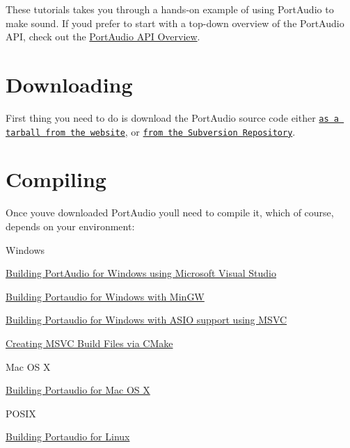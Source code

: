 These tutorials takes you through a hands-\/on example of using Port\+Audio to make sound. If you\textquotesingle{}d prefer to start with a top-\/down overview of the Port\+Audio A\+PI, check out the \hyperlink{api_overview}{Port\+Audio A\+PI Overview}.\hypertarget{tutorial_start_tut_start1}{}\section{Downloading}\label{tutorial_start_tut_start1}
First thing you need to do is download the Port\+Audio source code either \href{http://www.portaudio.com/download.html}{\tt as a tarball from the website}, or \href{http://www.portaudio.com/usingsvn.html}{\tt from the Subversion Repository}.\hypertarget{tutorial_start_tut_start2}{}\section{Compiling}\label{tutorial_start_tut_start2}
Once you\textquotesingle{}ve downloaded Port\+Audio you\textquotesingle{}ll need to compile it, which of course, depends on your environment\+:


\begin{DoxyItemize}
\item Windows
\begin{DoxyItemize}
\item \hyperlink{compile_windows}{Building Port\+Audio for Windows using Microsoft Visual Studio}
\item \hyperlink{compile_windows_mingw}{Building Portaudio for Windows with Min\+GW}
\item \hyperlink{compile_windows_asio_msvc}{Building Portaudio for Windows with A\+S\+IO support using M\+S\+VC}
\item \hyperlink{compile_cmake}{Creating M\+S\+VC Build Files via C\+Make}
\end{DoxyItemize}
\item Mac OS X
\begin{DoxyItemize}
\item \hyperlink{compile_mac_coreaudio}{Building Portaudio for Mac OS X}
\end{DoxyItemize}
\item P\+O\+S\+IX
\begin{DoxyItemize}
\item \hyperlink{compile_linux}{Building Portaudio for Linux}
\end{DoxyItemize}
\end{DoxyItemize}

